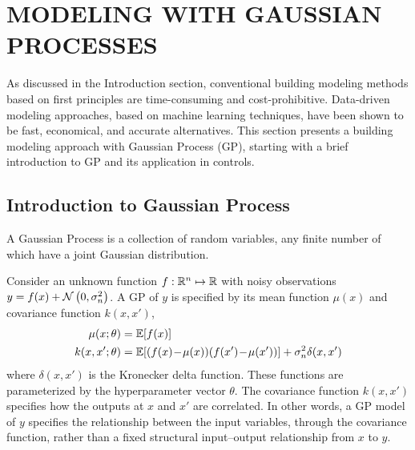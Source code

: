 \section{MODELING WITH GAUSSIAN PROCESSES}
\label{S:gp}

As discussed in the Introduction section, conventional building modeling methods based on first principles are time-consuming and cost-prohibitive.
Data-driven modeling approaches, based on machine learning techniques, have been shown to be fast, economical, and accurate alternatives.
This section presents a building modeling approach with Gaussian Process (GP), starting with a brief introduction to GP and its application in controls.
\subsection{Introduction to Gaussian Process}
\label{sec:gp:gp-intro}

\begin{definition}%
A Gaussian Process is a collection of random variables, any finite number of which have a joint Gaussian distribution.
\end{definition}
%
Consider an unknown function \(f: \mathbb{R}^n \mapsto \mathbb{R}\) with noisy observations \(y = f(x) + \operatorname*{\mathcal{N}}\left(0, \sigma_n^2\right)\).
A GP of \(y\) is specified by its mean function \(\mu(x)\) and covariance function \(k(x,x')\),
\begin{align}
\label{E:gp:prior}
\mu(x; \theta) &= \mathbb{E} [f(x)] \\
k(x,x'; \theta) &= \mathbb{E} [(f(x)\!-\!\mu(x)) (f(x') \!-\! \mu(x'))] + \sigma_n^2 \delta(x,x') \nonumber
\end{align}
where \(\delta(x,x')\) is the Kronecker delta function.
These functions are parameterized by the hyperparameter vector \(\theta\).
The covariance function \(k(x,x')\) specifies how the outputs at \(x\) and \(x'\) are correlated.
In other words, a GP model of \(y\) specifies the relationship between the input variables, through the covariance function, rather than a fixed structural input--output relationship from $x$ to $y$.

